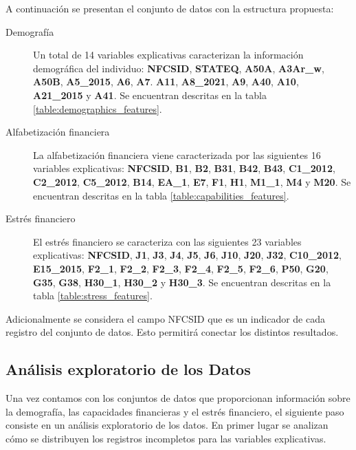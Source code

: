 \documentclass[a4paper, 11pt]{article}
\begin{document}
A continuación se presentan el conjunto de datos con la estructura propuesta:
\begin{description}
    \item[Demografía] Un total de 14 variables explicativas caracterizan la información demográfica del individuo: \textbf{NFCSID},
    \textbf{STATEQ}, \textbf{A50A}, \textbf{A3Ar\_w}, \textbf{A50B}, \textbf{A5\_2015}, \textbf{A6}, \textbf{A7}. \textbf{A11},
    \textbf{A8\_2021}, \textbf{A9}, \textbf{A40}, \textbf{A10}, \textbf{A21\_2015} y \textbf{A41}. Se encuentran descritas
    en la tabla \ref{table:demographics_features}.
    \item[Alfabetización financiera] La alfabetización financiera viene caracterizada por las siguientes 16 variables explicativas:
    \textbf{NFCSID}, \textbf{B1}, \textbf{B2}, \textbf{B31}, \textbf{B42}, \textbf{B43}, \textbf{C1\_2012}, \textbf{C2\_2012},
    \textbf{C5\_2012}, \textbf{B14}, \textbf{EA\_1}, \textbf{E7}, \textbf{F1}, \textbf{H1}, \textbf{M1\_1}, \textbf{M4} y
    \textbf{M20}. Se encuentran descritas en la tabla \ref{table:capabilities_features}.
    \item[Estrés financiero] El estrés financiero se caracteriza con las siguientes 23 variables explicativas: \textbf{NFCSID},
    \textbf{J1}, \textbf{J3}, \textbf{J4}, \textbf{J5}, \textbf{J6}, \textbf{J10}, \textbf{J20}, \textbf{J32}, \textbf{C10\_2012},
    \textbf{E15\_2015}, \textbf{F2\_1}, \textbf{F2\_2}, \textbf{F2\_3}, \textbf{F2\_4}, \textbf{F2\_5}, \textbf{F2\_6}, 
    \textbf{P50}, \textbf{G20}, \textbf{G35}, \textbf{G38}, \textbf{H30\_1}, \textbf{H30\_2} y \textbf{H30\_3}.
    Se encuentran descritas en la tabla \ref{table:stress_features}.
\end{description}

Adicionalmente se considera el campo NFCSID que es un indicador de cada registro
del conjunto de datos. Esto permitirá conectar los distintos resultados. 

\subsection{Análisis exploratorio de los Datos}
\label{sec:exploratory_analysis}
Una vez contamos con los conjuntos de datos que proporcionan información sobre
la demografía, las capacidades financieras y el estrés financiero, el siguiente
paso consiste en un análisis exploratorio de los datos. En primer lugar se
analizan cómo se distribuyen los registros incompletos para las variables explicativas.
\end{document}
